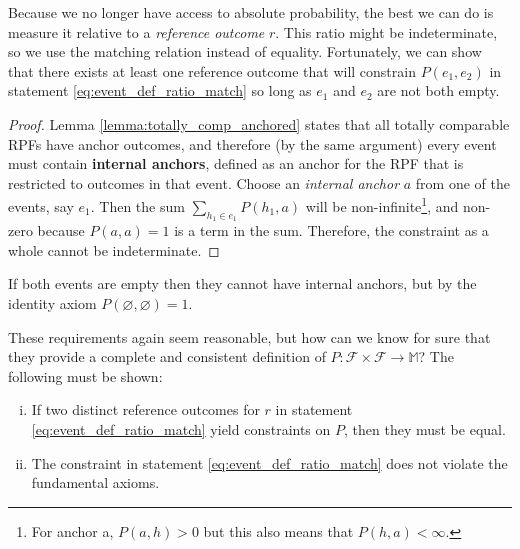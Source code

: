 \documentclass[twoside]{article}
\theoremstyle{plain}%
\theoremstyle{definition}
\theoremstyle{remark}
\begin{document}
Because we no longer have access to absolute probability, the best we can do is measure it relative to a \textit{reference outcome} \(r\). This ratio might be indeterminate, so we use the matching relation instead of equality. Fortunately, we can show that there exists at least one reference outcome that will constrain \(P(e_1, e_2)\) in statement \ref{eq:event_def_ratio_match} so long as \(e_1\) and \(e_2\) are not both empty.

\begin{proof} Lemma \ref{lemma:totally_comp_anchored} states that all totally comparable RPFs have anchor outcomes, and therefore (by the same argument) every event must contain \textbf{internal anchors}, defined as an anchor for the RPF that is restricted to outcomes in that event. Choose an \textit{internal anchor} \(a\) from one of the events, say \(e_1\). Then the sum \(\sum_{h_1 \in e_1} P(h_1, a)\) will be non-infinite\footnote{For anchor a, \(P(a, h) > 0\) but this also means that \(P(h, a) < \infty\).}, and non-zero because \(P(a, a) = 1\) is a term in the sum. Therefore, the constraint as a whole cannot be indeterminate.
\end{proof}

If both events are empty then they cannot have internal anchors, but by the identity axiom \(P(\varnothing, \varnothing) = 1\).

These requirements again seem reasonable, but how can we know for sure that they provide a complete and consistent definition of \(P: \mathcal{F} \times \mathcal{F} \rightarrow \mathbb{M}\)? The following must be shown:

\begin{enumerate}[(i)]
  \item \label{event_def_proof_1} If two distinct reference outcomes for \(r\) in statement \ref{eq:event_def_ratio_match} yield constraints on \(P\), then they must be equal.
  \item \label{event_def_proof_2} The constraint in statement \ref{eq:event_def_ratio_match} does not violate the fundamental axioms.
\end{enumerate}
\end{document}
